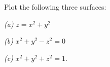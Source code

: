 Plot the following three surfaces:

\emph{(a)} $z=x^2+y^2$

\emph{(b)} $x^2+y^2-z^2 = 0$

\emph{(c)} $x^2+y^2+z^2=1$.